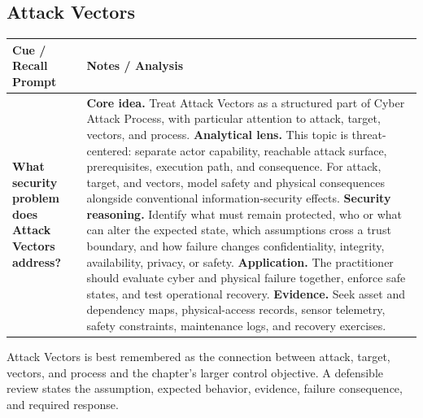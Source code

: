 \documentclass[11pt]{article}
\newcommand{\CornellHeader}{%
\rowcolor{Navy}\color{white}\bfseries Cue / Recall Prompt & \color{white}\bfseries Notes / Analysis\\\hline}
\newcommand{\CornellRow}[2]{%
\cellcolor{CueGray}\RaggedRight\textbf{#1} & \RaggedRight #2\\\hline}
\begin{document}
\subsection*{Attack Vectors}
\begin{longtable}{>{\RaggedRight\arraybackslash}p{}|>{\RaggedRight\arraybackslash}p{}}
\CornellHeader
\CornellRow{What security problem does Attack Vectors address?}{\textbf{Core idea.} Treat Attack Vectors as a structured part of Cyber Attack Process, with particular attention to attack, target, vectors, and process. \textbf{Analytical lens.} This topic is threat-centered: separate actor capability, reachable attack surface, prerequisites, execution path, and consequence. For attack, target, and vectors, model safety and physical consequences alongside conventional information-security effects. \textbf{Security reasoning.} Identify what must remain protected, who or what can alter the expected state, which assumptions cross a trust boundary, and how failure changes confidentiality, integrity, availability, privacy, or safety. \textbf{Application.} The practitioner should evaluate cyber and physical failure together, enforce safe states, and test operational recovery. \textbf{Evidence.} Seek asset and dependency maps, physical-access records, sensor telemetry, safety constraints, maintenance logs, and recovery exercises.}
\end{longtable}
\begin{topicsummary}
Attack Vectors is best remembered as the connection between attack, target, vectors, and process and the chapter's larger control objective. A defensible review states the assumption, expected behavior, evidence, failure consequence, and required response.
\end{topicsummary}
\end{document}
